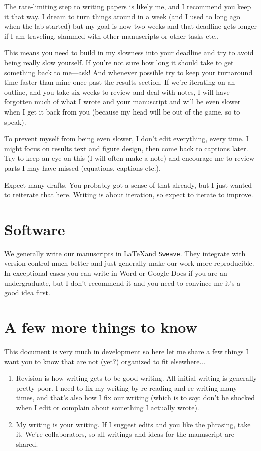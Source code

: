 \documentclass[11pt,letter]{article}
\begin{document}
The rate-limiting step to writing papers is likely me, and I recommend you keep it that way. I dream to turn things around in a week (and I used to long ago when the lab started) but my goal is now two weeks and that deadline gets longer if I am traveling, slammed with other manuscripts or other tasks etc.. 

This means you need to build in my slowness into your deadline and try to avoid being really slow yourself. If you're not sure how long it should take to get something back to me---ask! And whenever possible try to keep your turnaround time faster than mine once past the results section. If we're iterating on an outline, and you take six weeks to review and deal with notes, I will have forgotten much of what I wrote and your manuscript and will be even slower when I get it back from you (because my head will be out of the game, so to speak).  

To prevent myself from being even slower, I don't edit everything, every time. I might focus on results text and figure design, then come back to captions later. Try to keep an eye on this (I will often make a note) and encourage me to review parts I may have missed (equations, captions etc.). 

Expect many drafts. You probably got a sense of that already, but I just wanted to reiterate that here. Writing is about iteration, so expect to iterate to improve.

\section{Software}

We generally write our manuscripts in \LaTeX and \verb|Sweave|. They integrate with version control much better and just generally make our work more reproducible. In exceptional cases you can write in Word or Google Docs if you are an undergraduate, but I don't recommend it and you need to convince me it's a good idea first.  

\section{A few more things to know}

This document is very much in development so here let me share a few things I want you to know that are not (yet?) organized to fit elsewhere... 

\begin{enumerate}
\item Revision is how writing gets to be good writing. All initial writing is generally pretty poor. I need to fix my writing by re-reading and re-writing many times, and that's also how I fix our writing (which is to say: don't be shocked when I edit or complain about something I actually wrote).
\item My writing is your writing. If I suggest edits and you like the phrasing, take it. We're collaborators, so all writings and ideas for the manuscript are shared. 
\end{enumerate}
\end{document}
